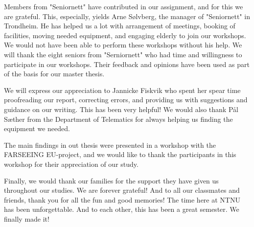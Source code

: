 \documentclass[b5paper,twoside,openright,11pt]{report}
\begin{document}
Members from "Seniornett" have contributed in our assignment, and for this we are grateful. This, especially, yields Arne Sølvberg, the manager of "Seniornett" in Trondheim. He has helped us a lot with arrangement of meetings, booking of facilities, moving needed equipment, and engaging elderly to join our workshops. We would not have been able to perform these workshops without his help. We will thank the eight seniors from "Serniornett" who had time and willingness to participate in our workshops. Their feedback and opinions have been used as part of the basis for our master thesis. 

We will express our appreciation to Jannicke Fiskvik who spent her spear time proofreading our report, correcting errors, and providing us with suggestions and guidance on our writing. This has been very helpful! We would also thank Pål Sæther from the Department of Telematics for always helping us finding the equipment we needed. 

The main findings in out thesis were presented in a workshop with the FARSEEING EU-project, and we would like to thank the participants in this workshop for their appreciation of our study. 

Finally, we would thank our families for the support they have given us throughout our studies. We are forever grateful! And to all our classmates and friends, thank you for all the fun and good memories! The time here at NTNU has been unforgettable. And to each other, this has been a great semester. We finally made it!   

\cleardoublepage
{}
\tableofcontents
\cleardoublepage

\cleardoublepage
\listoffigures
\cleardoublepage
\listoftables
\cleardoublepage
{}
\pagestyle{fancy}
\fancyhead[LE]{\thepage}
\fancyhead[RE]{\leftmark}
\fancyhead[RO]{\thepage}
\fancyhead[LO]{\rightmark}
\fancyfoot{}
\cleardoublepage

\cleardoublepage

\cleardoublepage

\cleardoublepage

\cleardoublepage

\cleardoublepage

\cleardoublepage

\cleardoublepage

\cleardoublepage

\cleardoublepage

\cleardoublepage

\cleardoublepage

\cleardoublepage

\cleardoublepage


\pagestyle{plain}
\cleardoublepage
\appendix 
  
\cleardoublepage
\end{document}
